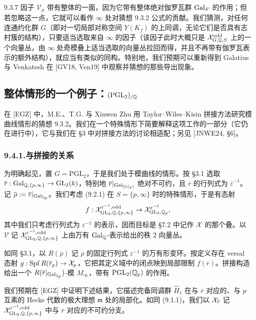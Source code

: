 \begin{rem}{9.3.7}\label{rem:a4-9-3-7}
因子 $\mathcal V_\mu$ 带有整体的一面，因为它带有整体绝对伽罗瓦群 $\operatorname{Gal}_F$ 的作用；但若忽略这一点，它就可以看作 $\infty$ 处对猜想 9.3.2 公式的贡献。我们猜测，对任何连通约化群 $G$（即对一切局部对称空间 $Y(K_f)$ 的上同调，无论它们是否具有志村簇的结构），只要适当选取来自 $\infty$ 的因子（该因子此时大概只是 $\mathcal{X}^{\mathrm{odd}}_{G,\mathbb{Q},S}$ 上的一个向量丛，由 $\infty$ 处奇模叠上适当选取的向量丛拉回而得，并且不再带有伽罗瓦表示的额外结构），就应当有类似的同构。特别地，我们预期可以重新得到 Galatius 与 Venkatesh 在 [GV18, Ven19] 中观察并猜想的那些导出现象。
\end{rem}

\subsection{整体情形的一个例子：$(\mathrm{PGL}_2)_{/\mathbb{Q}}$}
在 [EGZ] 中，M.E.、T.G. 与 Xinwen Zhu 用 Taylor--Wiles--Kisin 拼接方法研究模曲线情形的猜想 9.3.2。我们在一个特殊情形下简要解释这项工作的一部分（它仍在进行中），它与我们在 §3 中对拼接方法的讨论相适配；另见 [JNWE24, §6]。

\subsubsection*{9.4.1.\quad 与拼接的关系}
为明确起见，置 $G=\mathrm{PGL}_2$，于是我们处于模曲线的情形。按 §3.1 选取 $\overline{r}:\operatorname{Gal}_{\mathbb{Q},\{p,\infty\}}\to\mathrm{GL}_2(k)$，特别地 $\overline{r}|_{\operatorname{Gal}_{\mathbb{Q}(\zeta_p)}}$ 绝对不可约，且 $\overline{r}$ 的行列式为 $\overline{\varepsilon}^{-1}$。记 $\overline{\rho}:=\overline{r}|_{\operatorname{Gal}_{\mathbb{Q}_p}}$。我们考虑 (9.2.1) 在 $S=\{p,\infty\}$ 时的特殊情形，于是有态射
\[
f:\mathcal{X}^{\varepsilon^{-1},\mathrm{odd}}_{\mathrm{GL}_2,\mathbb{Q},\{p,\infty\}}\to\mathcal{X}^{\varepsilon^{-1}}_{\mathrm{GL}_2,\mathbb{Q}_p},
\]
其中我们只考虑行列式为 $\varepsilon^{-1}$ 的表示，因而目标是 §7.2 中记作 $\mathcal{X}$ 的那个叠。以 $\mathcal V$ 记 $\mathcal{X}^{\varepsilon^{-1},\mathrm{odd}}_{\mathrm{GL}_2,\mathbb{Q},\{p,\infty\}}$ 上由万有 $\operatorname{Gal}_{\mathbb{Q}}$-表示给出的秩 $2$ 向量丛。

如同 §3.1，以 $R(\overline{\rho})$ 记 $\overline{\rho}$ 的固定行列式 $\varepsilon^{-1}$ 的万有形变环。按定义存在 versal 态射 $g:\operatorname{Spf} R(\overline{r}_p)\to\mathcal{X}_p$，它把其定义域中的闭点映到局部限制 $f(\overline{r})$。拼接构造给出一个 $R(\overline{r}|_{\operatorname{Gal}_{\mathbb{Q}_p}})$-模 $M_\infty$，带有 $\mathrm{PGL}_2(\mathbb{Q}_p)$ 的作用。

我们预期在 [EGZ] 中证明下述结果，它描述完备同调群 $\widehat H_1$ 在与 $\overline{r}$ 对应的、与 $p$ 互素的 Hecke 代数的极大理想 $\mathfrak m$ 处的局部化。如同 (9.1.1)，我们以 $\mathcal{X}_{\overline{r}}$ 记 $\mathcal{X}^{\varepsilon^{-1},\mathrm{odd}}_{\mathrm{GL}_2,\mathbb{Q},\{p,\infty\}}$ 中与 $\overline{r}$ 对应的不可约分支。

